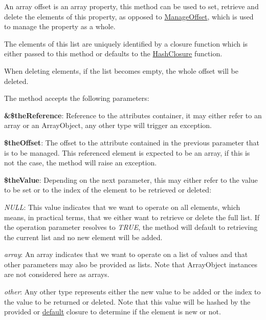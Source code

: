 An array offset is an array property, this method can be used to set, retrieve and delete the elements of this property, as opposed to \hyperlink{class_c_attribute_a9d231a47718719fcd6c33f3d0ac91675}{Manage\-Offset}, which is used to manage the property as a whole.

The elements of this list are uniquely identified by a closure function which is either passed to this method or defaults to the \hyperlink{class_c_attribute_af3647cf0f23e104446fa8ddf082461d7}{Hash\-Closure} function.

When deleting elements, if the list becomes empty, the whole offset will be deleted.

The method accepts the following parameters\-:


\begin{DoxyItemize}
\item {\bfseries \&\$the\-Reference}\-: Reference to the attributes container, it may either refer to an array or an Array\-Object, any other type will trigger an exception. 
\item {\bfseries \$the\-Offset}\-: The offset to the attribute contained in the previous parameter that is to be managed. This referenced element is expected to be an array, if this is not the case, the method will raise an exception. 
\item {\bfseries \$the\-Value}\-: Depending on the next parameter, this may either refer to the value to be set or to the index of the element to be retrieved or deleted\-: 
\begin{DoxyItemize}
\item {\itshape N\-U\-L\-L}\-: This value indicates that we want to operate on all elements, which means, in practical terms, that we either want to retrieve or delete the full list. If the operation parameter resolves to {\itshape T\-R\-U\-E}, the method will default to retrieving the current list and no new element will be added. 
\item {\itshape array}\-: An array indicates that we want to operate on a list of values and that other parameters may also be provided as lists. Note that Array\-Object instances are not considered here as arrays. 
\item {\itshape other}\-: Any other type represents either the new value to be added or the index to the value to be returned or deleted. Note that this value will be hashed by the provided or \hyperlink{class_c_attribute_af3647cf0f23e104446fa8ddf082461d7}{default} closure to determine if the element is new or not. 
\end{DoxyItemize}

\end{DoxyItemize}
